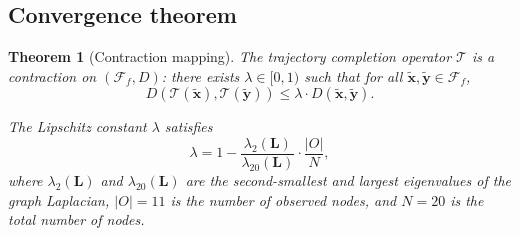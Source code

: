 \documentclass[twocolumn,10pt,a4paper]{article}
\newtheorem{theorem}{Theorem}[section]
\theoremstyle{definition}
\theoremstyle{remark}
\newcommand{\Fcal}{\mathcal{F}}
\newcommand{\Tcal}{\mathcal{T}}
\newcommand{\vect}[1]{\boldsymbol{#1}}
\newcommand{\mat}[1]{\mathbf{#1}}
\newcommand{\fuzzy}[1]{\widetilde{#1}}
\begin{document}
\subsection{Convergence theorem}

\begin{theorem}[Contraction mapping]\label{thm:contraction}
The trajectory completion operator $\Tcal$ is a contraction on $(\Fcal_f, D)$: there exists $\lambda \in [0, 1)$ such that for all $\fuzzy{\vect{x}}, \fuzzy{\vect{y}} \in \Fcal_f$,
\begin{equation}\label{eq:contraction}
    D(\Tcal(\fuzzy{\vect{x}}), \Tcal(\fuzzy{\vect{y}})) \leq \lambda \cdot D(\fuzzy{\vect{x}}, \fuzzy{\vect{y}}).
\end{equation}

The Lipschitz constant $\lambda$ satisfies
\begin{equation}\label{eq:lipschitz}
    \lambda = 1 - \frac{\lambda_2(\mat{L})}{\lambda_{20}(\mat{L})} \cdot \frac{|O|}{N},
\end{equation}
where $\lambda_2(\mat{L})$ and $\lambda_{20}(\mat{L})$ are the second-smallest and largest eigenvalues of the graph Laplacian, $|O| = 11$ is the number of observed nodes, and $N = 20$ is the total number of nodes.
\end{theorem}
\end{document}
